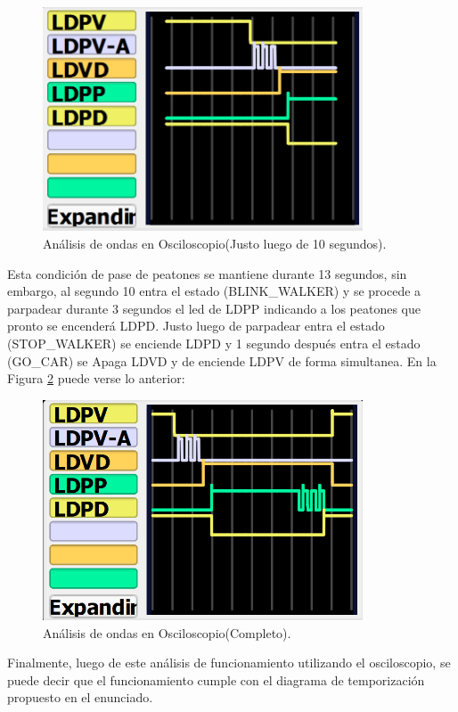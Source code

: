 \begin{figure}[H]
\centering
\includegraphics[width=95mm]{./Figuras/Desarrollo_Analisis/Luego_de_10_segundos_y_apretar_boton}
\caption{Análisis de ondas en Osciloscopio(Justo luego de 10 segundos).}
\label{fig:ondas2}
\end{figure}
    
Esta condición de pase de peatones se mantiene durante 13 segundos, sin embargo, al segundo 10 entra el estado (BLINK\_WALKER) y se procede a parpadear durante 3 segundos el led de LDPP indicando a los peatones que pronto se encenderá LDPD. Justo luego de parpadear entra el estado (STOP\_WALKER) se enciende LDPD y 1 segundo después entra el estado (GO\_CAR) se Apaga LDVD y de enciende LDPV de forma simultanea. En la Figura \ref{fig:ondas3} puede verse lo anterior:

\begin{figure}[H]
\centering
\includegraphics[width=95mm]{./Figuras/Desarrollo_Analisis/Ondas base}
\caption{Análisis de ondas en Osciloscopio(Completo).} 
\label{fig:ondas3}
\end{figure}

Finalmente, luego de este análisis de funcionamiento utilizando el osciloscopio, se puede decir que el funcionamiento cumple con el diagrama de temporización propuesto en el enunciado.